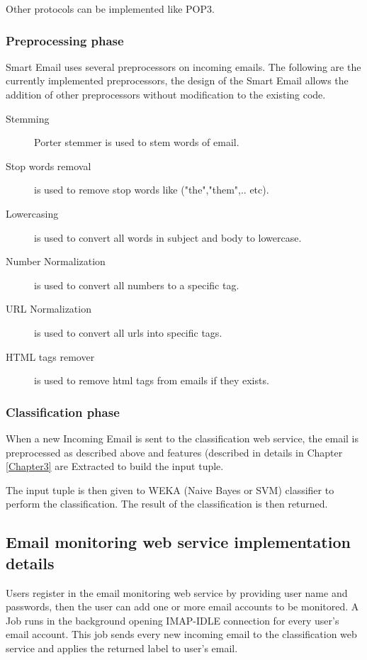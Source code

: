     Other protocols can be implemented like POP3.

    \subsubsection{Preprocessing phase}
    Smart Email uses several preprocessors on incoming emails. The following are the currently implemented preprocessors,
    the design of the Smart Email allows the addition of other preprocessors without modification to the existing code.
        \begin{description}
        \item[Stemming] Porter stemmer \cite{STEMMER} is used to stem words of email.
        \item[Stop words removal] is used to remove stop words like ("the","them",.. etc).
        \item[Lowercasing] is used to convert all words in subject and body to lowercase.
        \item[Number Normalization] is used to convert all numbers to a specific tag.
        \item[URL Normalization] is used to convert all urls into specific tags.
        \item[HTML tags remover] is used to remove html tags from emails if they exists.
        \end{description}

    \subsubsection{Classification phase}
    When a new Incoming Email is sent to the classification web service,
    the email is preprocessed as described above and features (described in details in Chapter \ref{Chapter3}
    are Extracted to build the input tuple.

    The input tuple is then given to WEKA \cite{WEKA} (Naive Bayes or SVM) classifier to 
    perform the classification. The result of the classification is then returned.

\subsection{Email monitoring web service implementation details}
    Users register in the email monitoring web service by providing user name and passwords,
    then the user can add one or more email accounts to be monitored.
    A Job runs in the background opening IMAP-IDLE connection for every user's email account.
    This job sends every new incoming email to the classification web service and
    applies the returned label to user's email.

